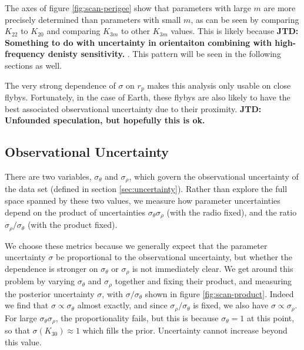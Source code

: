 \documentclass[fleqn,usenatbib]{mnras}
\newcommand{\jtd}[1]{ {\bf{\color{red} JTD: #1}} }
\begin{document}
The axes of figure \ref{fig:scan-perigee} show that parameters with large $m$ are more precisely determined than parameters with small $m$, as can be seen by comparing $K_{22}$ to $K_{20}$ and comparing $K_{3m}$ to other $K_{3m}$ values. This is likely because \jtd{Something to do with uncertainty in orientaiton combining with high-frequency denisty sensitivity.}. This pattern will be seen in the following sections as well.

The very strong dependence of $\sigma$ on $r_p$ makes this analysis only usable on close flybys. Fortunately, in the case of Earth, these flybys are also likely to have the best associated observational uncertainty due to their proximity. \jtd{Unfounded speculation, but hopefully this is ok.}


\subsection{Observational Uncertainty}
\label{sec:scan-uncertainty}
There are two variables, $\sigma_\theta$ and $\sigma_\rho$, which govern the observational uncertainty of the data set (defined in section \ref{sec:uncertainty}). Rather than explore the full space spanned by these two values, we measure how parameter uncertainties depend on the product of uncertainties $\sigma_\theta\sigma_\rho$ (with the radio fixed), and the ratio $\sigma_\rho / \sigma_\theta$ (with the product fixed).

We choose these metrics because we generally expect that the parameter uncertainty $\sigma$ be proportional to the observational uncertainty, but whether the dependence is stronger on $\sigma_\theta$ or $\sigma_\rho$ is not immediately clear. We get around this problem by varying $\sigma_\theta$ and $\sigma_\rho$ together and fixing their product, and measuring the posterior uncertainty $\sigma$, with $\sigma/\sigma_\theta$ shown in figure \ref{fig:scan-product}. Indeed we find that $\sigma \propto \sigma_\theta$ almost exactly, and since $\sigma_\rho / \sigma_\theta$ is fixed, we also have $\sigma \propto \sigma_\rho$. For large $\sigma_\theta \sigma_\rho$, the proportionality fails, but this is because $\sigma_\theta = 1$ at this point, so that $\sigma(K_{30}) \approx 1$ which fills the prior. Uncertainty cannot increase beyond this value.
\end{document}
